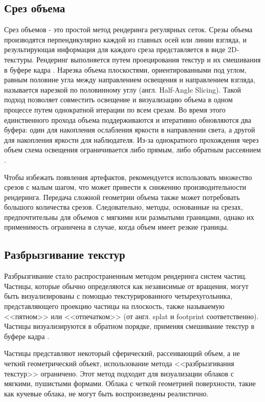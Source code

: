 \subsection{Срез объема}
\label{slice}
Срез объемов - это простой метод рендеринга регулярных сеток. Срезы объема производятся перпендикулярно каждой из главных осей или линии взгляда, и результирующая информация для каждого среза представляется в виде 2D-текстуры. Рендеринг выполняется путем проецирования текстур и их смешивания в буфере кадра \cite{vs}. Нарезка объема плоскостями, ориентированными под углом, равным половине угла между направлением освещения и направлением взгляда, называется нарезкой по половинному углу (англ. Half-Angle Slicing). Такой подход позволяет совместить освещение и визуализацию объема в одном процессе путем однократной итерации по всем срезам. Во время этого единственного прохода объема поддерживаются и итеративно обновляются два буфера: один для накопления ослабления яркости в направлении света, а другой для накопления яркости для наблюдателя. Из-за однократного прохождения через объем схема освещения ограничивается либо прямым, либо обратным рассеянием \cite{clouds}. 

Чтобы избежать появления артефактов, рекомендуется использовать множество срезов с малым шагом, что может привести к снижению производительности рендеринга. Передача сложной геометрии объема также может потребовать большого количества срезов. Следовательно, методы, основанные на срезах, предпочтительны для объемов с мягкими или размытыми границами, однако их применимость ограничена в случае, когда объем имеет резкие границы.

\subsection{Разбрызгивание текстур}
\label{splatting}
Разбрызгивание стало распространенным методом рендеринга систем частиц. Частицы, которые обычно определяются как независимые от вращения, могут быть визуализированы с помощью текстурированного четырехугольника, представляющего проекцию частицы на плоскость, также называемую <<пятном>> или <<отпечатком>> (от англ. splat и footprint соответственно). Частицы визуализируются в обратном порядке, применяя смешивание текстур в буфере кадра \cite{voxel, clouds}. 

Частицы представляют некоторый сферический, рассеивающий объем, а не четкий геометрический объект, использование метода <<разбрызгивания текстур>> ограничено.  Этот метод подходит для визуализации облаков с мягкими, пушистыми формами. Облака с четкой геометрией поверхности, такие как кучевые облака, не могут быть воспроизведены реалистично.


